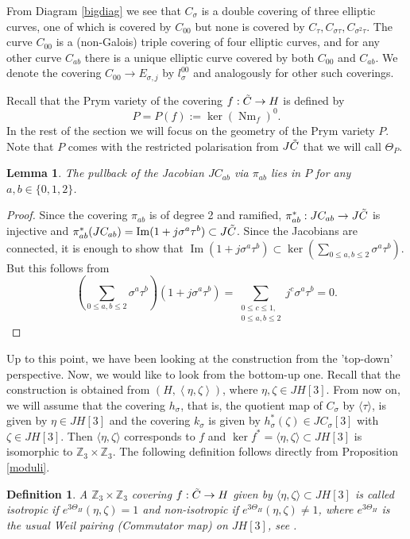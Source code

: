 \documentclass{amsart}
\newtheorem{lem}[thm]{Lemma}
\newtheorem{defn}[thm]{Definition}
\theoremstyle{remark}
\numberwithin{equation}{section}
\newcommand{\ZZ}{\mathbb Z}
\newcommand{\tC}{\Tilde{C}}
\newcommand{\s}{\sigma}
\DeclareMathOperator{\im}{Im}
\DeclareMathOperator{\Nm}{Nm}
\begin{document}
From Diagram \ref{bigdiag} we see that $C_{\sigma}$ is a double covering of three elliptic curves, one of which is covered by $C_{00}$ but none is covered by $C_{\tau}, C_{\sigma\tau}, C_{\sigma^2\tau}$. The curve $C_{00}$ is a (non-Galois) triple covering of four elliptic curves, and for any other curve $C_{ab}$ there is a unique elliptic curve covered by both $C_{00}$ and $C_{ab}$. We denote the covering $C_{00} \to E_{\s, j}$ by $l_{\s}^{00}$ and analogously for other such coverings. 

Recall that the Prym variety of the covering $f: \tC \to H$ is defined by $$P = P(f) := \ker(\Nm_f)^0.$$ In the rest of the section we will focus on the geometry of the Prym variety $P$. Note that $P$ comes with the restricted polarisation from $J\tC$ that we will call $\Theta_P$. 

\begin{lem}
    The pullback of the Jacobian $JC_{ab}$ via $\pi_{ab}$ lies in $P$ for any $a,b\in\{0,1,2\}$.
\end{lem}

\begin{proof}
    Since the covering $\pi_{ab}$ is of degree 2 and ramified, $\pi_{ab}^*: JC_{ab} \to J\Tilde{C}$ is injective \cite[Proposition 11.4.3]{BL} and $\pi_{ab}^*(JC_{ab}) = \im (1 + j\sigma^a\tau^b) \subset J\Tilde{C}$.
    Since the Jacobians are connected, it is enough to show that $ \im (1 + j\sigma^a\tau^b) \subset \ker(\sum_{0 \leq a,b \leq 2} \sigma^a\tau^b)$. But this follows from
    $$\left(\sum_{0 \leq a,b \leq 2} \sigma^a\tau^b\right)(1 + j\sigma^a\tau^b) = \sum_{\substack{0 \leq c \leq 1,\\0 \leq a,b \leq 2}}j^c\sigma^a\tau^b = 0.$$
\end{proof}

Up to this point, we have been looking at the construction from the 'top-down' perspective. Now, we would like to look from the bottom-up one. Recall that the construction is obtained from $(H,\left<\eta,\zeta\right>)$, where $\eta,\zeta\in JH[3]$. From now on, we will assume that the covering $h_{\s}$, that is, the quotient map of $C_{\s}$ by $\langle \tau \rangle$, is given by $\eta\in JH[3]$ and the covering $k_{\s}$ is given by $h_{\s}^*(\zeta) \in JC_{\s}[3]$ with $\zeta \in JH[3]$. Then $\langle \eta, \zeta \rangle$ corresponds to $f$ and $\ker f^* = \langle \eta, \zeta \rangle \subset JH[3]$ is isomorphic to $\mathbb{Z}_3 \times \mathbb{Z}_3$. The following definition follows directly from Proposition \ref{moduli}.
\begin{defn}\label{defniso}
A $\ZZ_3\times\ZZ_3$ covering $f:\tC\to H$ given by $\langle \eta, \zeta \rangle \subset JH[3]$ is called \it{isotropic} if $e^{3\Theta_H}(\eta, \zeta) = 1$ and \it{non-isotropic} if $e^{3\Theta_H}(\eta, \zeta) \neq 1$, where $e^{3\Theta_H}$ is the usual Weil pairing (Commutator map) on $JH[3]$, see \cite[Chap 6.3]{BL}.
\end{defn}
\end{document}
